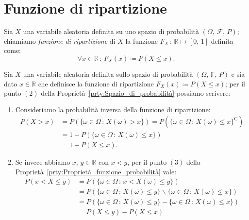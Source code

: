     \section{Funzione di ripartizione}
        \begin{defn}\label{defn:Funzione_ripartizione}
            Sia $X$ una variabile aleatoria definita su uno spazio di probabilità $(\Omega,\,\mathscr{F},\,P)$; chiamiamo \textit{funzione di ripartizione} di $X$ la funzione $F_X\,:\, \mathbb{R} \mapsto [0,\,1]$ definita come: \[
                \forall x \in \mathbb{R} \,:\, F_X(x) \coloneqq P(X \leq x)
            .\]
        \end{defn}
        \begin{obsv}\label{obsv:Funzione_ripartizione}
            Sia $X$ una variabile aleatoria definita sullo spazio di probabilità $(\Omega,\,\mathbb{F},\,P)$ e sia dato $x \in \mathbb{R}$ che definisce la funzione di ripartizione $F_X(x) \coloneqq P(X \leq x)$; per il punto $(2)$ della Proprietà~\ref{prty:Spazio_di_probabilità} possiamo scrivere:
            \begin{enumerate}[\indent (a)]
                \item Consideriamo la probabilità inversa della funzione di ripartizione:
                    \begin{align*}
                        P(X > x) &= P(\{\omega \in \Omega \,:\, X(\omega) > x\}) = P(\{\omega \in \Omega \,:\, X(\omega) \leq x\}^{\text{C}}) \\
                                 &= 1 - P(\{\omega \in \Omega \,:\, X(\omega) \leq x\}) \\
                                 &= 1 - P(X \leq x)
                    .\end{align*}
                \item Se invece abbiamo $x,\,y \in \mathbb{R}$ con $x < y$, per il punto $(3)$ della Proprietà~\ref{prty:Proprietà_funzione_probabilità} vale:
                    \begin{align*}
                        P(x < X \leq y) &= P(\{\omega \in \Omega \,:\, x < X(\omega) \leq y\}) \\
                                     &= P(\{\omega \in \Omega \,:\, X(\omega) \leq y\} \backslash \{\omega \in \Omega \,:\, X(\omega) \leq x\}) \\
                                     &= P(\{\omega \in \Omega \,:\, X(\omega) \leq y\} - \{\omega \in \Omega \,:\, X(\omega) \leq x\}) \\
                                     &= P(X \leq y) - P(X \leq x)

\end{align*}
\end{enumerate}
\end{obsv}
